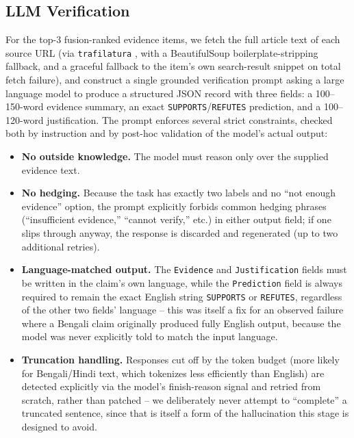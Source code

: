 \documentclass[
]{ceurart}
\begin{document}
\subsection{LLM Verification}
\label{sec:st2-verification}

For the top-3 fusion-ranked evidence items, we fetch the full article
text of each source URL (via \texttt{trafilatura}
\cite{barbaresi2021trafilatura}, with a BeautifulSoup
boilerplate-stripping fallback, and a graceful fallback to the item's
own search-result snippet on total fetch failure), and construct a
single grounded verification prompt asking a large language model to
produce a structured JSON record with three fields: a 100--150-word
evidence summary, an exact \texttt{SUPPORTS}/\texttt{REFUTES}
prediction, and a 100--120-word justification. The prompt enforces
several strict constraints, checked both by instruction and by post-hoc
validation of the model's actual output:

\begin{itemize}
  \item \textbf{No outside knowledge.} The model must reason only over
    the supplied evidence text.
  \item \textbf{No hedging.} Because the task has exactly two labels and
    no ``not enough evidence'' option, the prompt explicitly forbids
    common hedging phrases (``insufficient evidence,'' ``cannot
    verify,'' etc.) in either output field; if one slips through
    anyway, the response is discarded and regenerated (up to two
    additional retries).
  \item \textbf{Language-matched output.} The \texttt{Evidence} and
    \texttt{Justification} fields must be written in the claim's own
    language, while the \texttt{Prediction} field is always required
    to remain the exact English string \texttt{SUPPORTS} or
    \texttt{REFUTES}, regardless of the other two fields' language --
    this was itself a fix for an observed failure where a Bengali claim
    originally produced fully English output, because the model was
    never explicitly told to match the input language.
  \item \textbf{Truncation handling.} Responses cut off by the token
    budget (more likely for Bengali/Hindi text, which tokenizes less
    efficiently than English) are detected explicitly via the model's
    finish-reason signal and retried from scratch, rather than patched
    -- we deliberately never attempt to ``complete'' a truncated
    sentence, since that is itself a form of the hallucination this
    stage is designed to avoid.
\end{itemize}
\end{document}
